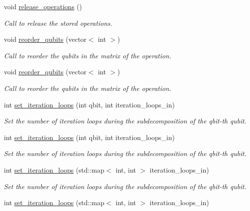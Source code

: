 \begin{DoxyCompactItemize}
void \hyperlink{class_operation__block_a7c3d4eadaef2f21f1c5dd9227faec7ce}{release\+\_\+operations} ()
\begin{DoxyCompactList}\small\item\em Call to release the stored operations. \end{DoxyCompactList}\item 
void \hyperlink{class_operation__block_af2a71d29cdbce498e85f11b9ed81e0c9}{reorder\+\_\+qubits} (vector$<$ int $>$)
\begin{DoxyCompactList}\small\item\em Call to reorder the qubits in the matrix of the operation. \end{DoxyCompactList}\item 
void \hyperlink{class_operation__block_af2a71d29cdbce498e85f11b9ed81e0c9}{reorder\+\_\+qubits} (vector$<$ int $>$)
\begin{DoxyCompactList}\small\item\em Call to reorder the qubits in the matrix of the operation. \end{DoxyCompactList}\item 
int \hyperlink{class_decomposition___base_aaf2862ee2211dac36242551340190b4b}{set\+\_\+iteration\+\_\+loops} (int qbit, int iteration\+\_\+loops\+\_\+in)
\begin{DoxyCompactList}\small\item\em Set the number of iteration loops during the subdecomposition of the qbit-\/th qubit. \end{DoxyCompactList}\item 
int \hyperlink{class_decomposition___base_aaf2862ee2211dac36242551340190b4b}{set\+\_\+iteration\+\_\+loops} (int qbit, int iteration\+\_\+loops\+\_\+in)
\begin{DoxyCompactList}\small\item\em Set the number of iteration loops during the subdecomposition of the qbit-\/th qubit. \end{DoxyCompactList}\item 
int \hyperlink{class_decomposition___base_aa376f8cfdb1b9ed06bceff9c72ddf496}{set\+\_\+iteration\+\_\+loops} (std\+::map$<$ int, int $>$ iteration\+\_\+loops\+\_\+in)
\begin{DoxyCompactList}\small\item\em Set the number of iteration loops during the subdecomposition of the qbit-\/th qubit. \end{DoxyCompactList}\item 
int \hyperlink{class_decomposition___base_aa376f8cfdb1b9ed06bceff9c72ddf496}{set\+\_\+iteration\+\_\+loops} (std\+::map$<$ int, int $>$ iteration\+\_\+loops\+\_\+in)

\end{DoxyCompactItemize}
